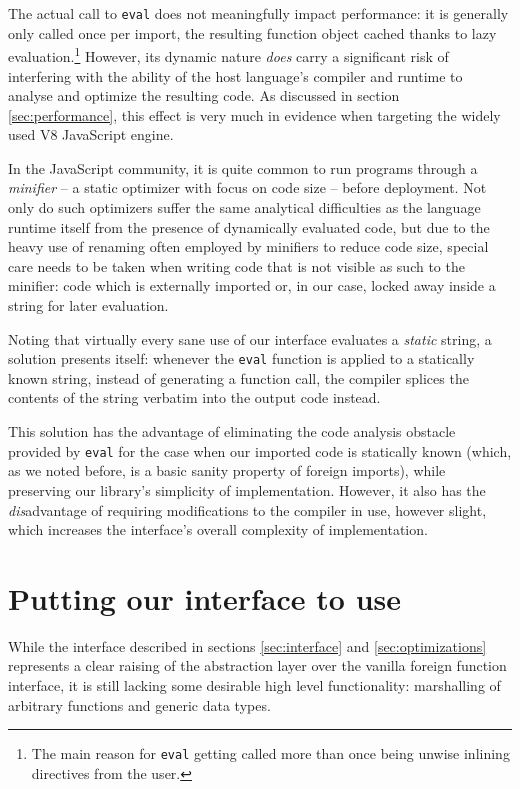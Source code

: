 \documentclass[preprint]{sigplanconf}
\begin{document}
The actual call to \lstinline!eval! does not meaningfully impact
performance: it is generally only called once per import,
the resulting function object cached thanks to lazy evaluation.\footnote{
  The main reason for \lstinline!eval! getting called more than once
  being unwise inlining directives from the user.
}
However, its dynamic nature \emph{does}
carry a significant risk of interfering with the ability of the host language's
compiler and runtime to analyse and optimize the resulting code.
As discussed in section \ref{sec:performance}, this effect is very much in
evidence when targeting the widely used V8 JavaScript engine.

In the JavaScript community, it is quite common to run programs through a
\emph{minifier} -- a static optimizer with focus on code size -- before
deployment. Not only do such optimizers suffer the same analytical
difficulties as the language runtime itself from the presence of dynamically
evaluated code, but due to the heavy use of
renaming often employed by minifiers to reduce code size, special care needs
to be taken when writing code that is not visible as such to the minifier:
code which is externally imported or, in our case, locked away inside a string
for later evaluation.

Noting that virtually every sane use of our interface evaluates a \emph{static}
string, a solution presents itself: whenever the \lstinline!eval! function
is applied to a statically known string, instead of generating a function call,
the compiler splices the contents of the string verbatim into the output code
instead.

This solution has the advantage of eliminating the code analysis obstacle
provided by \lstinline!eval! for the case when our imported code is statically
known (which, as we noted before, is a basic sanity property of foreign
imports), while preserving our library's simplicity of implementation.
However, it also has the \emph{dis}advantage of requiring modifications to the
compiler in use, however slight, which increases the interface's overall
complexity of implementation.

\section{Putting our interface to use}
\label{sec:extensions}
While the interface described in sections \ref{sec:interface} and
\ref{sec:optimizations} represents a clear raising of the abstraction layer
over the vanilla foreign function interface, it is still lacking some
desirable high level functionality: marshalling of arbitrary functions and
generic data types.
\end{document}
